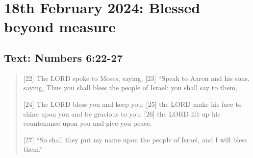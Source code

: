 \setcounter{figure}{0}

\section{18th February 2024: Blessed beyond measure}
\subsection*{Text: Numbers 6:22-27}
  \begin{quote}
    [22] The LORD spoke to Moses, saying, [23] “Speak to Aaron and his sons, saying, Thus you shall bless the people of Israel: you shall say to them,

    [24] The LORD bless you and keep you;
    [25] the LORD make his face to shine upon you and be gracious to you;
    [26] the LORD lift up his countenance upon you and give you peace.

    [27] “So shall they put my name upon the people of Israel, and I will bless them.”
  \end{quote}
